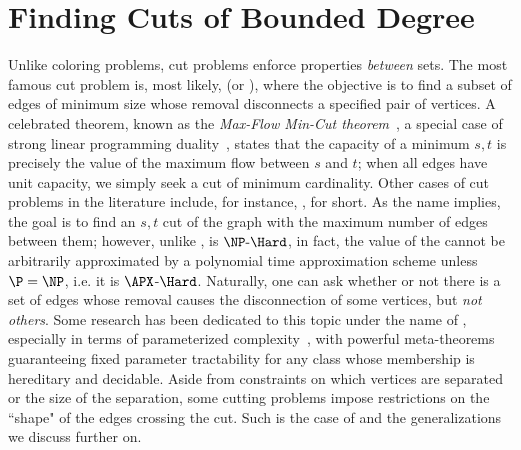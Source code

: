 \chapter{Finding Cuts of Bounded Degree}

Unlike coloring problems, cut problems enforce properties \textit{between} sets.
The most famous cut problem is, most likely,  (or ), where the objective is to find a subset of edges of minimum size whose removal disconnects a specified pair of vertices.
A celebrated theorem, known as the \textit{Max-Flow Min-Cut theorem}~\citep{ford_fulkerson}, a special case of strong linear programming duality~\citep{linear_optimization}, states that the capacity of a minimum $s,t$ is precisely the value of the maximum flow between $s$ and $t$; when all edges have unit capacity, we simply seek a cut of minimum cardinality.
Other cases of cut problems in the literature include, for instance, ,  for short.
As the name implies, the goal is to find an $s,t$ cut of the graph with the maximum number of edges between them; however, unlike ,  is $\NPH$, in fact, the value of the cannot be arbitrarily approximated by a polynomial time approximation scheme unless $\P = \NP$, i.e. it is $\APX$-$\Hard$.
Naturally, one can ask whether or not there is a set of edges whose removal causes the disconnection of some vertices, but \textit{not others}.
Some research has been dedicated to this topic under the name of , especially in terms of parameterized complexity~\citep{marx_treewidth_reduction,marx_separation}, with powerful meta-theorems guaranteeing fixed parameter tractability for any class whose membership is hereditary and decidable.
Aside from constraints on which vertices are separated or the size of the separation, some cutting problems impose restrictions on the ``shape" of the edges crossing the cut.
Such is the case of  and the generalizations we discuss further on.


